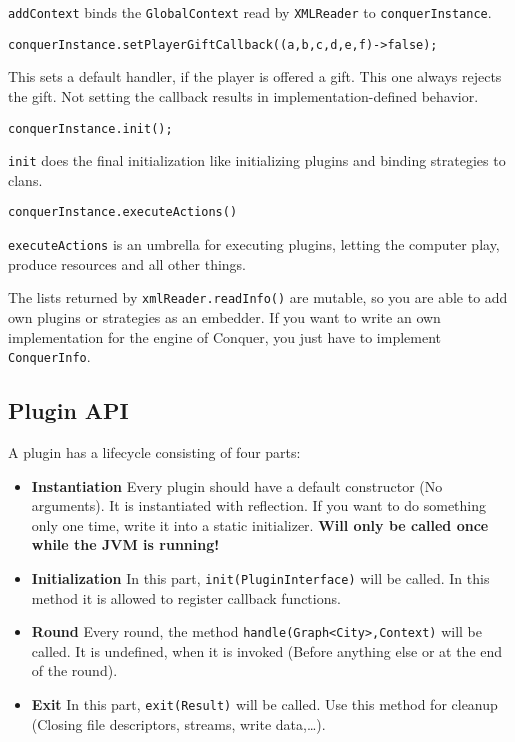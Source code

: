 \documentclass{article}
\begin{document}
\texttt{addContext} binds the \texttt{GlobalContext} read by \texttt{XMLReader} to \texttt{conquerInstance}.
\begin{verbatim}
conquerInstance.setPlayerGiftCallback((a,b,c,d,e,f)->false);
\end{verbatim}
This sets a default handler, if the player is offered a gift. This one always rejects the gift. Not setting the callback results in implementation-defined behavior.
\begin{verbatim}
conquerInstance.init();
\end{verbatim}
\texttt{init} does the final initialization like initializing plugins and binding strategies to clans.
\begin{verbatim}
conquerInstance.executeActions()
\end{verbatim}
\texttt{executeActions} is an umbrella for executing plugins, letting the computer play, produce resources and all other things.\newline

The lists returned by \texttt{xmlReader.readInfo()} are mutable, so you are able to add own plugins or strategies as an embedder.\newline
If you want to write an own implementation for the engine of Conquer, you just have to implement \texttt{ConquerInfo}.

\subsection{Plugin API}
A plugin has a lifecycle consisting of four parts:
\begin{itemize}
	\item \textbf{Instantiation} Every plugin should have a default constructor (No arguments). It is instantiated with reflection. If you want to do something only one time, write it into a static initializer. \textbf{Will only be called once while the JVM is running!}
	\item \textbf{Initialization} In this part, \texttt{init(PluginInterface)} will be called. In this method it is allowed to register callback functions.
	\item \textbf{Round} Every round, the method \texttt{handle(Graph<City>,Context)} will be called. It is undefined, when it is invoked (Before anything else or at the end of the round).
	\item \textbf{Exit} In this part, \texttt{exit(Result)} will be called. Use this method for cleanup (Closing file descriptors, streams, write data,\ldots).
	
\end{itemize}
\end{document}
